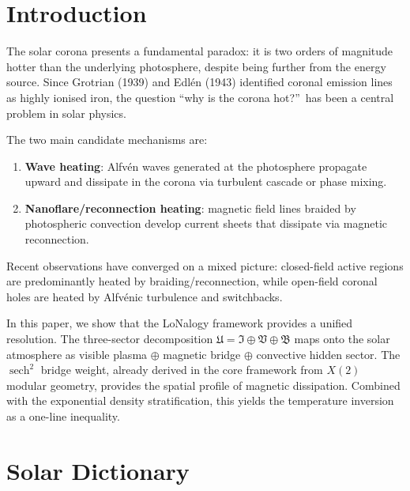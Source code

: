 \documentclass[12pt]{article}
\theoremstyle{plain}
\theoremstyle{definition}
\numberwithin{equation}{section}
\newcommand{\fU}{\mathfrak{U}}
\newcommand{\fI}{\mathfrak{I}}
\newcommand{\fV}{\mathfrak{V}}
\newcommand{\fB}{\mathfrak{B}}
\DeclareMathOperator{\sech}{sech}
\begin{document}
\setcounter{page}{1}
\tableofcontents
\newpage


\section{Introduction}\label{sec:intro}

The solar corona presents a fundamental paradox: it is two orders
of magnitude hotter than the underlying photosphere, despite being
further from the energy source.  Since Grotrian (1939) and Edl\'en
(1943) identified coronal emission lines as highly ionised iron,
the question ``why is the corona hot?''\ has been a central problem
in solar physics.

The two main candidate mechanisms are:
\begin{enumerate}[label=(\roman*)]
\item \textbf{Wave heating}: Alfv\'en waves generated at the
photosphere propagate upward and dissipate in the corona via
turbulent cascade or phase mixing.
\item \textbf{Nanoflare/reconnection heating}: magnetic field
lines braided by photospheric convection develop current sheets
that dissipate via magnetic reconnection.
\end{enumerate}
Recent observations have converged on a mixed picture: closed-field
active regions are predominantly heated by braiding/reconnection,
while open-field coronal holes are heated by Alfv\'enic turbulence
and switchbacks.

In this paper, we show that the LoNalogy framework provides a
unified resolution.  The three-sector decomposition
$\fU=\fI\oplus\fV\oplus\fB$ maps onto the solar atmosphere as
visible plasma $\oplus$ magnetic bridge $\oplus$ convective hidden
sector.  The $\sech^2$ bridge weight, already derived in the core
framework from $X(2)$ modular geometry, provides the spatial
profile of magnetic dissipation.  Combined with the exponential
density stratification, this yields the temperature inversion as
a one-line inequality.


\section{Solar Dictionary}\label{sec:dictionary}
\end{document}
